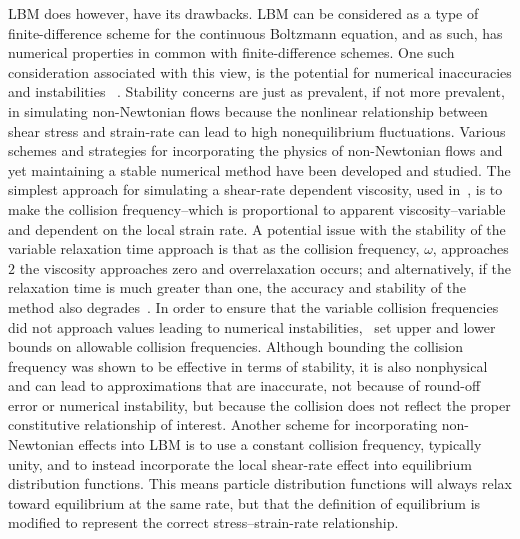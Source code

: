 \documentclass[pdftex,ms]{pittetd}
\begin{document}
LBM does however, have its drawbacks.
LBM can be considered as a type of finite-difference scheme for the continuous Boltzmann equation, and as such, has numerical properties in common with finite-difference schemes.
One such consideration associated with this view, is the potential for numerical inaccuracies and instabilities ~\cite{sterling1993stability,sterling1996stability,bawazeer2013stability,lallemand2000theory}. %
Stability concerns are just as prevalent, if not more prevalent, in simulating non-Newtonian flows because the nonlinear relationship between shear stress and strain-rate can lead to high nonequilibrium fluctuations. %
Various schemes and strategies for incorporating the physics of non-Newtonian flows and yet maintaining a stable numerical method have been developed and studied.
The simplest approach for simulating a shear-rate dependent viscosity, used in~\cite{boyd2006second,chen2014simulations,fallah2012multiple,tang2011bingham,svec2011flow,svec2012free,zhao2016lattice}, is to make the collision frequency--which is proportional to apparent viscosity--variable and dependent on the local strain rate.
A potential issue with the stability of the variable relaxation time approach is that as the collision frequency, $\omega$, approaches $2$ the viscosity approaches zero and overrelaxation occurs; and alternatively, if the relaxation time is much greater than one, the accuracy and stability of the method also degrades~\cite{latt2007hydrodynamic}. %
In order to ensure that the variable collision frequencies did not approach values leading to numerical instabilities,~\cite{svec2011flow,svec2012free,gabbanelli2005lattice} set upper and lower bounds on allowable collision frequencies.
Although bounding the collision frequency was shown to be effective in terms of stability, it is also nonphysical and can lead to approximations that are inaccurate, not because of round-off error or numerical instability, but because the collision does not reflect the proper constitutive relationship of interest.
Another scheme for incorporating non-Newtonian effects into LBM is to use a constant collision frequency, typically unity, and to instead incorporate the local shear-rate effect into equilibrium distribution functions.
This means particle distribution functions will always relax toward equilibrium at the same rate, but that the definition of equilibrium is modified to represent the correct stress--strain-rate relationship.
\end{document}

